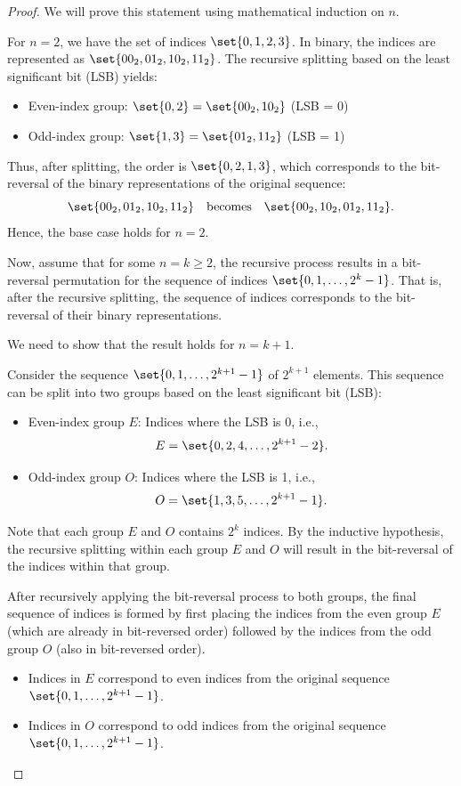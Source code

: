 \begin{proof}
	We will prove this statement using mathematical induction on $n$.
	
	For $n = 2$, we have the set of indices $\set{0, 1, 2, 3}$. In binary, the indices are represented as $\set{00_2, 01_2, 10_2, 11_2}$. The recursive splitting based on the least significant bit (LSB) yields:
	\begin{itemize}
		\item Even-index group: $\set{0, 2}= \set{00_2, 10_2}$ (LSB = 0)
		\item Odd-index group: $\set{1, 3}= \set{01_2, 11_2}$ (LSB = 1)
	\end{itemize}
	
	Thus, after splitting, the order is $\set{0, 2, 1, 3}$, which corresponds to the bit-reversal of the binary representations of the original sequence:
	\[
	\set{00_2, 01_2, 10_2, 11_2} \quad \text{becomes} \quad \set{00_2, 10_2, 01_2, 11_2}.
	\]
	Hence, the base case holds for $n=2$.
	
	Now, assume that for some $n = k \geq 2$, the recursive process results in a bit-reversal permutation for the sequence of indices $\set{0, 1, \ldots, 2^k - 1}$. That is, after the recursive splitting, the sequence of indices corresponds to the bit-reversal of their binary representations.
	
	We need to show that the result holds for $n = k+1$.
	
	Consider the sequence $\set{0, 1, \ldots, 2^{k+1} - 1}$ of $2^{k+1}$ elements. This sequence can be split into two groups based on the least significant bit (LSB):
	\begin{itemize}
		\item Even-index group $E$: Indices where the LSB is 0, i.e., 
		\[
		E = \set{0, 2, 4, \ldots, 2^{k+1} - 2}.
		\]
		\item Odd-index group $O$: Indices where the LSB is 1, i.e., 
		\[
		O = \set{1, 3, 5, \ldots, 2^{k+1} - 1}.
		\]
	\end{itemize}
	
	Note that each group $E$ and $O$ contains $2^k$ indices. By the inductive hypothesis, the recursive splitting within each group $E$ and $O$ will result in the bit-reversal of the indices within that group.
	
	After recursively applying the bit-reversal process to both groups, the final sequence of indices is formed by first placing the indices from the even group $E$ (which are already in bit-reversed order) followed by the indices from the odd group $O$ (also in bit-reversed order).
	\begin{itemize}
		\item Indices in $E$ correspond to even indices from the original sequence $\set{0, 1, \ldots, 2^{k+1} - 1}$.
		\item Indices in $O$ correspond to odd indices from the original sequence $\set{0, 1, \ldots, 2^{k+1} - 1}$.
	\end{itemize}
	

\end{proof}
